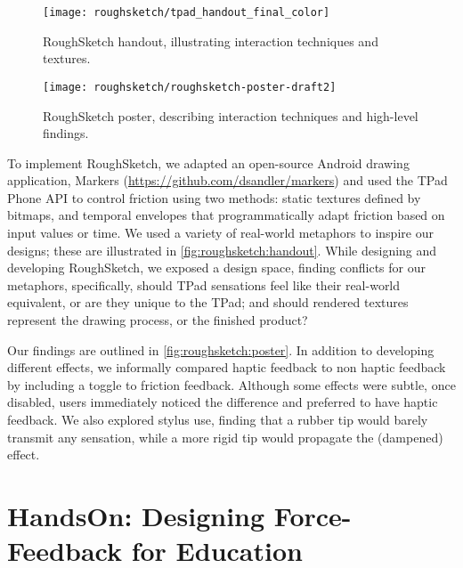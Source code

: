 \begin{figure}[htbp] %
   \centering
   \texttt{[image: roughsketch/tpad\_handout\_final\_color]} 
   \caption{RoughSketch handout, illustrating interaction techniques and textures.}
   \label{fig:roughsketch:handout}
\end{figure}

\begin{figure}[htbp] %
   \centering
   \texttt{[image: roughsketch/roughsketch-poster-draft2]} 
   \caption{RoughSketch poster, describing interaction techniques and high-level findings.}
   \label{fig:roughsketch:poster}
\end{figure}

\noindent
To implement RoughSketch, we adapted an open-source Android drawing application, Markers (\url{https://github.com/dsandler/markers}) and used the TPad Phone API to control friction using two methods:
static textures defined by bitmaps, and
temporal envelopes that programmatically adapt friction based on input values or time.
We used a variety of real-world metaphors to inspire our designs; these are
illustrated in \autoref{fig:roughsketch:handout}.
While designing and developing RoughSketch, we exposed a design space, finding conflicts for our metaphors, specifically, should TPad sensations feel like their real-world equivalent, or are they unique to the TPad; and 
should rendered textures represent the drawing process, or the finished product?

Our findings are outlined in \autoref{fig:roughsketch:poster}.
In addition to developing different effects, we informally compared haptic feedback to non haptic feedback by including a toggle to friction feedback.
Although some effects were subtle, once disabled, users immediately noticed the difference and preferred to have haptic feedback.
We also explored stylus use, finding that a rubber tip would barely transmit any sensation, while a more rigid tip would propagate the (dampened) effect.




\section{HandsOn: Designing Force-Feedback for Education}
\label{sec:applications:handson}

